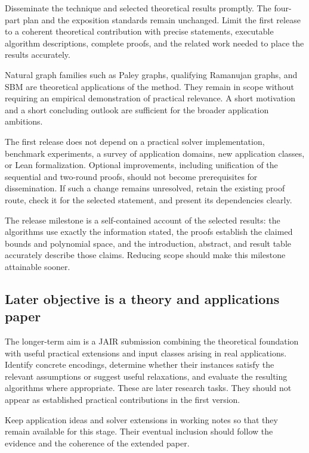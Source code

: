\documentclass[11pt,a4paper]{article}
\begin{document}
Disseminate the technique and selected theoretical results promptly.
The four-part plan and the exposition standards remain unchanged.
Limit the first release to a coherent theoretical contribution with
precise statements, executable algorithm descriptions, complete proofs,
and the related work needed to place the results accurately.

Natural graph families such as Paley graphs, qualifying Ramanujan graphs,
and SBM are theoretical applications of the method. They remain in scope
without requiring an empirical demonstration of practical relevance.
A short motivation and a short concluding outlook are sufficient for
the broader application ambitions.

The first release does not depend on a practical solver implementation,
benchmark experiments, a survey of application domains, new application
classes, or Lean formalization. Optional improvements, including
unification of the sequential and two-round proofs, should not become
prerequisites for dissemination. If such a change remains unresolved,
retain the existing proof route, check it for the selected statement,
and present its dependencies clearly.

The release milestone is a self-contained account of the selected
results: the algorithms use exactly the information stated, the proofs
establish the claimed bounds and polynomial space, and the introduction,
abstract, and result table accurately describe those claims. Reducing
scope should make this milestone attainable sooner.

\subsection{Later objective is a theory and applications paper}

The longer-term aim is a JAIR submission combining the theoretical
foundation with useful practical extensions and input classes arising
in real applications. Identify concrete encodings, determine whether
their instances satisfy the relevant assumptions or suggest useful
relaxations, and evaluate the resulting algorithms where appropriate.
These are later research tasks. They should not appear as established
practical contributions in the first version.

Keep application ideas and solver extensions in working notes so that
they remain available for this stage. Their eventual inclusion should
follow the evidence and the coherence of the extended paper.
\end{document}
